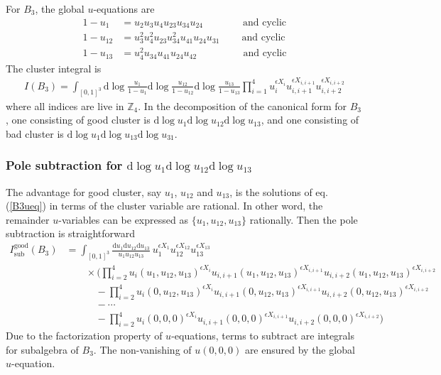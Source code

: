 \documentclass[12pt]{article}
\theoremstyle{definition}
\theoremstyle{plain}
\newcommand{\dif}{\mathrm{d}} %
\begin{document}
For $B_{3}$, the global $u$-equations are
\begin{align}
    1-u_{1}&=u_{2}u_{3}u_{4}u_{23}u_{34}u_{24}  \qquad \qquad\text{and cyclic}  \nonumber \\
    1-u_{12}&=u_{3}^{2}u_{4}^{2}u_{23}u_{34}^{2}u_{41}u_{24}u_{31}  \qquad \:\text{and cyclic}  \label{B3ueq} \\
    1-u_{13}&=u_{4}^{2}u_{34}u_{41}u_{24}u_{42}  \qquad\qquad\:\:\:\text{and cyclic} \nonumber 
\end{align}
The cluster integral is 
\begin{align}
    I(B_{3})=\int_{[0,1]^{3}} \dif \log\frac{u_{1}}{1-u_{1}}\dif \log\frac{u_{12}}{1-u_{12}}\dif \log\frac{u_{13}}{1-u_{13}} 
    \prod_{i=1}^{4} u_{i}^{\epsilon X_{i}} u_{i,i+1}^{\epsilon X_{i,i+1}} u_{i,i+2}^{\epsilon X_{i,i+2}} \label{B3int}
\end{align}
where all indices are live in $\mathds{Z}_{4}$. In the decomposition of the canonical form for $B_{3}$, one consisting of good cluster is $\dif \log u_{1}\dif\log u_{12}\dif \log u_{13}$, and one consisting of bad cluster is $\dif \log u_{1} \dif \log u_{13}\dif \log u_{31}$.

\subsubsection*{Pole subtraction for $\dif \log u_{1}\dif\log u_{12}\dif \log u_{13}$} 

The advantage for good cluster, say $u_{1}$, $u_{12}$ and $u_{13}$, is the solutions of eq.(\ref{B3ueq}) in terms of the cluster variable are rational. In other word, the remainder $u$-variables can be expressed as $\{u_{1},u_{12},u_{13}\}$ rationally. Then the pole subtraction is straightforward
\begin{align}
    I_{\text{sub}}^{\text{good}}(B_{3})&=\int_{[0,1]^{3}}\frac{\dif u_{1}\dif u_{12}\dif u_{13}}{u_{1}u_{12}u_{13}}\:u_{1}^{\epsilon X_{1}}u_{12}^{\epsilon X_{12}}u_{13}^{\epsilon X_{13}} \nonumber \\
    &\qquad \times \Biggl(\prod_{i=2}^{4} u_{i}(u_{1},u_{12},u_{13})^{\epsilon X_{i}} u_{i,i+1}(u_{1},u_{12},u_{13})^{\epsilon X_{i,i+1}} u_{i,i+2}(u_{1},u_{12},u_{13})^{\epsilon X_{i,i+2}} \nonumber \\
    &\qquad \quad -\prod_{i=2}^{4} u_{i}(0,u_{12},u_{13})^{\epsilon X_{i}} u_{i,i+1}(0,u_{12},u_{13})^{\epsilon X_{i,i+1}} u_{i,i+2}(0,u_{12},u_{13})^{\epsilon X_{i,i+2}}  \nonumber \\
    &\qquad\quad  -\cdots  \nonumber \\
    &\qquad \quad -\prod_{i=2}^{4} u_{i}(0,0,0)^{\epsilon X_{i}} u_{i,i+1}(0,0,0)^{\epsilon X_{i,i+1}} u_{i,i+2}(0,0,0)^{\epsilon X_{i,i+2}}
    \Biggr)
\end{align}
Due to the factorization property of $u$-equations, terms to subtract are integrals for subalgebra of $B_{3}$. The non-vanishing of $u(0,0,0)$ are ensured by the global $u$-equation.
\end{document}
